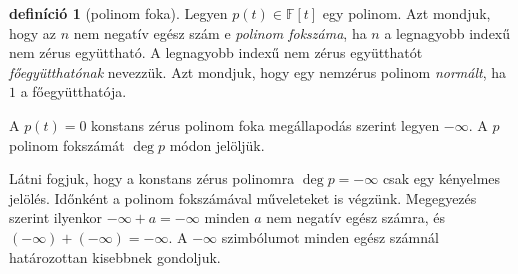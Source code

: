 \documentclass[9pt, a4paper, showtrims]{memoir}
\theoremstyle{plain}
\theoremstyle{remark}
\theoremstyle{definition}
\newtheorem{definition}[proposition]{definíció}
\begin{document}
\begin{definition}[polinom foka]
	Legyen $p\left( t \right)\in\mathbb{F}\left[ t \right]$ egy polinom.
	Azt mondjuk, hogy az $n$ nem negatív egész szám e \emph{polinom fokszáma},
	ha $n$ a legnagyobb indexű nem zérus együttható.
	A legnagyobb indexű nem zérus együtthatót \emph{főegyütthatónak} nevezzük.
	Azt mondjuk, hogy egy nemzérus polinom \emph{normált}, ha $1$ a főegyütthatója.

	A $p\left( t \right)=0$ konstans zérus polinom foka megállapodás szerint legyen $-\infty$.
	A $p$ polinom fokszámát $\deg p$ módon jelöljük.
\end{definition}
Látni fogjuk, hogy a konstans zérus polinomra $\deg p=-\infty$ csak egy kényelmes jelölés.
Időnként a polinom fokszámával műveleteket is végzünk.
Megegyezés szerint ilyenkor $-\infty+a=-\infty$ minden $a$ nem negatív egész számra,
és $\left( -\infty \right)+\left( -\infty \right)=-\infty.$
A $-\infty$ szimbólumot minden egész számnál határozottan kisebbnek gondoljuk.
\end{document}
